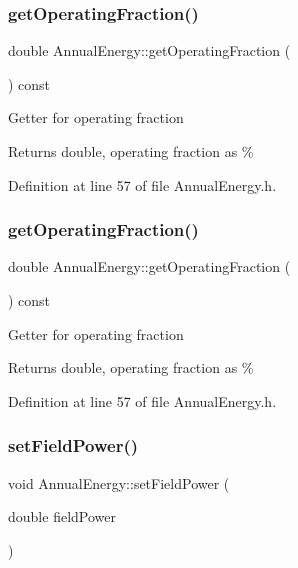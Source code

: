 \subsubsection{\texorpdfstring{get\+Operating\+Fraction()}{getOperatingFraction()}\hspace{0.1cm}{\footnotesize\ttfamily [2/3]}}
{\footnotesize\ttfamily double Annual\+Energy\+::get\+Operating\+Fraction (\begin{DoxyParamCaption}{ }\end{DoxyParamCaption}) const\hspace{0.3cm}{\ttfamily [inline]}}

Getter for operating fraction \begin{DoxyReturn}{Returns}
double, operating fraction as \% 
\end{DoxyReturn}


Definition at line 57 of file Annual\+Energy.\+h.

\mbox{\label{class_annual_energy_a51c2bd68a5268ec9bafe3c70b3a7a6ad}} 
\subsubsection{\texorpdfstring{get\+Operating\+Fraction()}{getOperatingFraction()}\hspace{0.1cm}{\footnotesize\ttfamily [3/3]}}
{\footnotesize\ttfamily double Annual\+Energy\+::get\+Operating\+Fraction (\begin{DoxyParamCaption}{ }\end{DoxyParamCaption}) const\hspace{0.3cm}{\ttfamily [inline]}}

Getter for operating fraction \begin{DoxyReturn}{Returns}
double, operating fraction as \% 
\end{DoxyReturn}


Definition at line 57 of file Annual\+Energy.\+h.

\mbox{\label{class_annual_energy_a4f7212fcf2f6fcd2b12f36ca26a368a1}} 
\subsubsection{\texorpdfstring{set\+Field\+Power()}{setFieldPower()}\hspace{0.1cm}{\footnotesize\ttfamily [1/3]}}
{\footnotesize\ttfamily void Annual\+Energy\+::set\+Field\+Power (\begin{DoxyParamCaption}\item[{double}]{field\+Power }\end{DoxyParamCaption})\hspace{0.3cm}{\ttfamily [inline]}}

